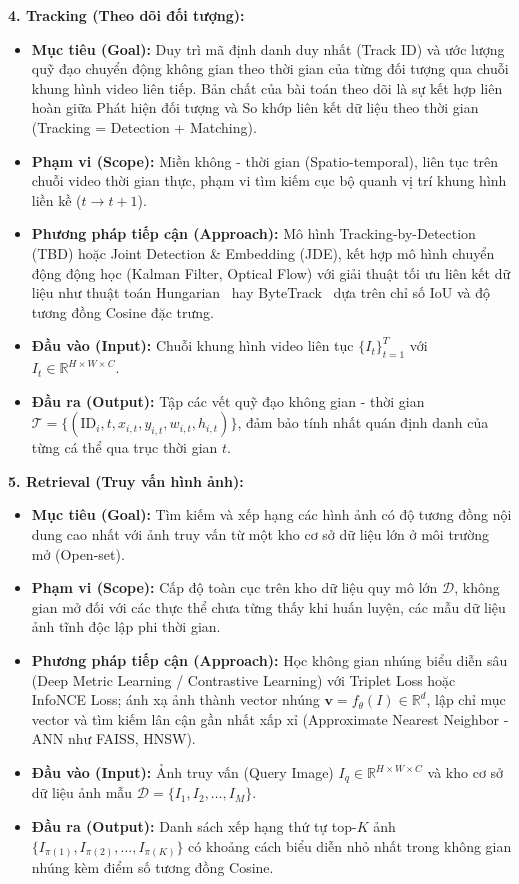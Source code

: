 \textbf{4. Tracking (Theo dõi đối tượng):}
\begin{itemize}
    \item \textbf{Mục tiêu (Goal):} Duy trì mã định danh duy nhất (Track ID) và ước lượng quỹ đạo chuyển động không gian theo thời gian của từng đối tượng qua chuỗi khung hình video liên tiếp. Bản chất của bài toán theo dõi là sự kết hợp liên hoàn giữa Phát hiện đối tượng và So khớp liên kết dữ liệu theo thời gian (Tracking = Detection + Matching).
    \item \textbf{Phạm vi (Scope):} Miền không - thời gian (Spatio-temporal), liên tục trên chuỗi video thời gian thực, phạm vi tìm kiếm cục bộ quanh vị trí khung hình liền kề ($t \rightarrow t+1$).
    \item \textbf{Phương pháp tiếp cận (Approach):} Mô hình Tracking-by-Detection (TBD) hoặc Joint Detection \& Embedding (JDE), kết hợp mô hình chuyển động động học (Kalman Filter, Optical Flow) với giải thuật tối ưu liên kết dữ liệu như thuật toán Hungarian~\citep{kuhn1955hungarian} hay ByteTrack~\citep{zhang2022bytetrack} dựa trên chỉ số IoU và độ tương đồng Cosine đặc trưng.
    \item \textbf{Đầu vào (Input):} Chuỗi khung hình video liên tục $\{I_t\}_{t=1}^T$ với $I_t \in \mathbb{R}^{H \times W \times C}$.
    \item \textbf{Đầu ra (Output):} Tập các vết quỹ đạo không gian - thời gian $\mathcal{T} = \{(\text{ID}_i, t, x_{i,t}, y_{i,t}, w_{i,t}, h_{i,t})\}$, đảm bảo tính nhất quán định danh của từng cá thể qua trục thời gian $t$.
\end{itemize}

\textbf{5. Retrieval (Truy vấn hình ảnh):}
\begin{itemize}
    \item \textbf{Mục tiêu (Goal):} Tìm kiếm và xếp hạng các hình ảnh có độ tương đồng nội dung cao nhất với ảnh truy vấn từ một kho cơ sở dữ liệu lớn ở môi trường mở (Open-set).
    \item \textbf{Phạm vi (Scope):} Cấp độ toàn cục trên kho dữ liệu quy mô lớn $\mathcal{D}$, không gian mở đối với các thực thể chưa từng thấy khi huấn luyện, các mẫu dữ liệu ảnh tĩnh độc lập phi thời gian.
    \item \textbf{Phương pháp tiếp cận (Approach):} Học không gian nhúng biểu diễn sâu (Deep Metric Learning / Contrastive Learning) với Triplet Loss hoặc InfoNCE Loss; ánh xạ ảnh thành vector nhúng $\mathbf{v} = f_\theta(I) \in \mathbb{R}^d$, lập chỉ mục vector và tìm kiếm lân cận gần nhất xấp xỉ (Approximate Nearest Neighbor - ANN như FAISS, HNSW).
    \item \textbf{Đầu vào (Input):} Ảnh truy vấn (Query Image) $I_q \in \mathbb{R}^{H \times W \times C}$ và kho cơ sở dữ liệu ảnh mẫu $\mathcal{D} = \{I_1, I_2, \dots, I_M\}$.
    \item \textbf{Đầu ra (Output):} Danh sách xếp hạng thứ tự top-$K$ ảnh $\{I_{\pi(1)}, I_{\pi(2)}, \dots, I_{\pi(K)}\}$ có khoảng cách biểu diễn nhỏ nhất trong không gian nhúng kèm điểm số tương đồng Cosine.
\end{itemize}

